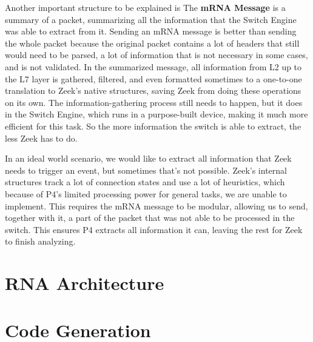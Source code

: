 Another important structure to be explained is The \textbf{mRNA Message} is a summary of a packet, summarizing all the information that the Switch Engine was able to extract from it. Sending an mRNA message is better than sending the whole packet because the original packet contains a lot of headers that still would need to be parsed, a lot of information that is not necessary in some cases, and is not validated. In the summarized message, all information from L2 up to the L7 layer is gathered, filtered, and even formatted sometimes to a one-to-one translation to Zeek's native structures, saving Zeek from doing these operations on its own. The information-gathering process still needs to happen, but it does in the Switch Engine, which runs in a purpose-built device, making it much more efficient for this task. So the more information the switch is able to extract, the less Zeek has to do.

In an ideal world scenario, we would like to extract all information that Zeek needs to trigger an event, but sometimes that's not possible. Zeek's internal structures track a lot of connection states and use a lot of heuristics, which because of P4's limited processing power for general tasks, we are unable to implement. This requires the mRNA message to be modular, allowing us to send, together with it, a part of the packet that was not able to be processed in the switch. This ensures P4 extracts all information it can, leaving the rest for Zeek to finish analyzing.

% 
\section{RNA Architecture}





\section{Code Generation}




